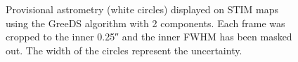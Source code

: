 \documentclass[twocolumn]{aastex631}
\begin{document}
\begin{figure}[h!]
    \centering
    \caption{Provisional astrometry (white circles) displayed on STIM maps using the GreeDS algorithm with 2 components. Each frame was cropped to the inner \ang{;;0.25} and the inner FWHM has been masked out. The width of the circles represent the uncertainty.}
    \label{fig:prov-orbit}
\end{figure}
\end{document}
